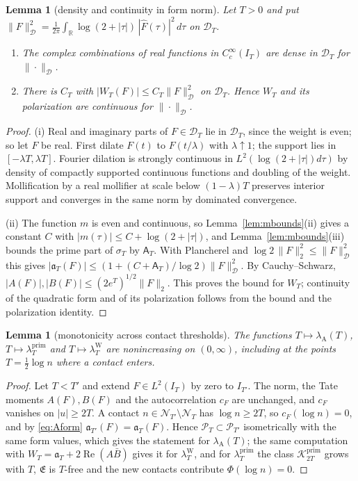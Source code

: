 \documentclass[10pt]{amsart}
\newtheorem{lemma}[theorem]{Lemma}
\theoremstyle{definition}
\theoremstyle{remark}
\newcommand{\R}{\mathbb R}
\newcommand{\Rel}{\operatorname{Re}}
\newcommand{\Kp}{\mathcal K^{\mathrm{prim}}_{2T}}
\newcommand{\PT}{\mathcal P_T}
\newcommand{\IT}{I_T}
\newcommand{\lamP}{\lambda^{\mathrm{prim}}_T}
\newcommand{\lamW}{\lambda^{\mathrm W}_T}
\newcommand{\lamA}{\lambda_{\mathrm A}(T)}
\newcommand{\sT}{\sigma_T}
\newcommand{\Fh}{\widehat F}
\newcommand{\cF}{c_F}
\newcommand{\Lev}{\mathfrak E}
\newcommand{\NT}{\mathcal N_T}
\newcommand{\Aconst}{\mathsf A_T}
\begin{document}
\begin{lemma}[density and continuity in form norm]\label{lem:form-density}
Let $T>0$ and put
$\|F\|_{\mathcal D}^2=\frac1{2\pi}\int_\R\log(2+|\tau|)\,|\Fh(\tau)|^2\,d\tau$
on $\mathcal D_T$.
\begin{enumerate}
\item[(i)] The complex combinations of real functions in $C_c^\infty(\IT)$
are dense in $\mathcal D_T$ for $\|\cdot\|_{\mathcal D}$.
\item[(ii)] There is $C_T$ with $|W_T(F)|\le C_T\|F\|_{\mathcal D}^2$ on
$\mathcal D_T$. Hence $W_T$ and its polarization are continuous for
$\|\cdot\|_{\mathcal D}$.
\end{enumerate}
\end{lemma}
\begin{proof}
(i) Real and imaginary parts of $F\in\mathcal D_T$ lie in $\mathcal D_T$,
since the weight is even; so let $F$ be real. First dilate $F(t)$ to
$F(t/\lambda)$ with $\lambda\uparrow1$; the support lies in
$[-\lambda T,\lambda T]$. Fourier dilation is strongly continuous in
$L^2(\log(2+|\tau|)d\tau)$ by density of compactly supported continuous
functions and doubling of the weight. Mollification by a real mollifier at
scale below $(1-\lambda)T$ preserves interior support and converges in the
same norm by dominated convergence.

(ii) The function $m$ is even and continuous, so Lemma~\ref{lem:mbounds}(ii)
gives a constant $C$ with $|m(\tau)|\le C+\log(2+|\tau|)$, and
Lemma~\ref{lem:mbounds}(iii) bounds the prime part of $\sT$ by $\Aconst$.
With Plancherel and $\log2\,\|F\|_2^2\le\|F\|_{\mathcal D}^2$ this gives
$|\mathfrak a_T(F)|\le(1+(C+\Aconst)/\log2)\|F\|_{\mathcal D}^2$. By
Cauchy--Schwarz, $|A(F)|,|B(F)|\le(2e^T)^{1/2}\|F\|_2$. This proves the bound
for $W_T$; continuity of the quadratic form and of its polarization follows
from the bound and the polarization identity.
\end{proof}

\begin{lemma}[monotonicity across contact thresholds]\label{lem:monoT}
The functions $T\mapsto\lamA$, $T\mapsto\lamP$ and $T\mapsto\lamW$ are nonincreasing on $(0,\infty)$,
including at the points $T=\frac12\log n$ where a contact enters.
\end{lemma}
\begin{proof}
Let $T<T'$ and extend $F\in L^2(\IT)$ by zero to $I_{T'}$. The norm, the Tate moments $A(F),B(F)$ and
the autocorrelation $\cF$ are unchanged, and $\cF$ vanishes on $|u|\ge2T$. A contact
$n\in\mathcal N_{T'}\setminus\NT$ has $\log n\ge2T$, so $\cF(\log n)=0$, and by \eqref{eq:Aform}
$\mathfrak a_{T'}(F)=\mathfrak a_T(F)$. Hence $\PT\subset\mathcal P_{T'}$ isometrically with the same
form values, which gives the statement for $\lamA$; the same computation with $W_T=\mathfrak a_T+2\Rel(A\bar B)$
gives it for $\lamW$, and for $\lamP$ the class $\Kp$ grows with $T$, $\Lev$ is $T$-free and the new
contacts contribute $\Phi(\log n)=0$.
\end{proof}
\end{document}
